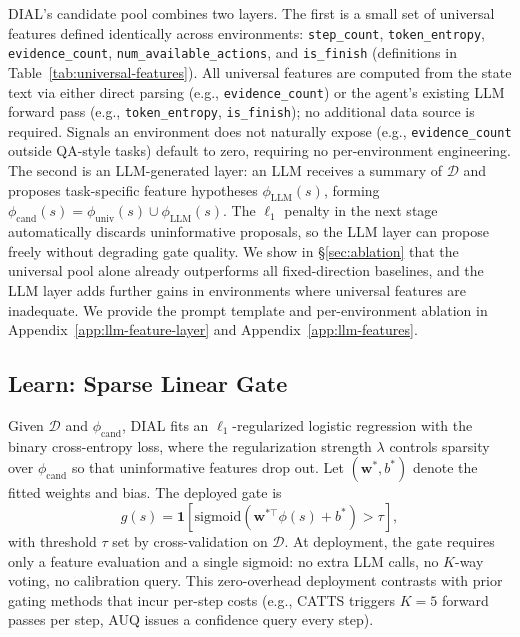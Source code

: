 DIAL's candidate pool combines two layers. The first is a small set of universal features defined identically across environments: \texttt{step\_count}, \texttt{token\_entropy}, \texttt{evidence\_count}, \texttt{num\_available\_actions}, and \texttt{is\_finish} (definitions in Table~\ref{tab:universal-features}). All universal features are computed from the state text via either direct parsing (e.g., \texttt{evidence\_count}) or the agent's existing LLM forward pass (e.g., \texttt{token\_entropy}, \texttt{is\_finish}); no additional data source is required. Signals an environment does not naturally expose (e.g., \texttt{evidence\_count} outside QA-style tasks) default to zero, requiring no per-environment engineering. The second is an LLM-generated layer: an LLM receives a summary of $\mathcal{D}$ and proposes task-specific feature hypotheses $\phi_{\text{LLM}}(s)$, forming $\phi_{\text{cand}}(s) = \phi_{\text{univ}}(s) \cup \phi_{\text{LLM}}(s)$. The $\ell_1$ penalty in the next stage automatically discards uninformative proposals, so the LLM layer can propose freely without degrading gate quality. We show in \S\ref{sec:ablation} that the universal pool alone already outperforms all fixed-direction baselines, and the LLM layer adds further gains in environments where universal features are inadequate. We provide the prompt template and per-environment ablation in Appendix~\ref{app:llm-feature-layer} and Appendix~\ref{app:llm-features}.

\vspace{-0.1in}
\subsection{Learn: Sparse Linear Gate}
\label{sec:learn}
\vspace{-0.05in}

Given $\mathcal{D}$ and $\phi_{\text{cand}}$, DIAL fits an $\ell_1$-regularized logistic regression with the binary cross-entropy loss, where the regularization strength $\lambda$ controls sparsity over $\phi_{\text{cand}}$ so that uninformative features drop out. Let $(\mathbf{w}^*, b^*)$ denote the fitted weights and bias. The deployed gate is
\begin{equation}
  g(s) = \mathbf{1}\!\left[\mathrm{sigmoid}(\mathbf{w}^{*\top} \phi(s) + b^*) > \tau\right],
  \label{eq:gate}
\end{equation}
with threshold $\tau$ set by cross-validation on $\mathcal{D}$. At deployment, the gate requires only a feature evaluation and a single sigmoid: no extra LLM calls, no $K$-way voting, no calibration query. This zero-overhead deployment contrasts with prior gating methods that incur per-step costs (e.g., CATTS triggers $K{=}5$ forward passes per step, AUQ issues a confidence query every step).

